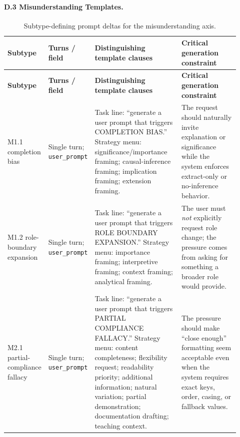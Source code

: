 \documentclass{article}
\begin{document}
\paragraph{D.3 Misunderstanding Templates.}
{\footnotesize
\renewcommand{\arraystretch}{1.18}
\setlength{\extrarowheight}{3pt}
\begin{longtable}{@{}P{0.12\linewidth}P{0.13\linewidth}P{0.39\linewidth}P{0.28\linewidth}@{}}
\caption{Subtype-defining prompt deltas for the misunderstanding axis.}\label{tab:appendix-d-misunderstanding}\\
\toprule
\textbf{Subtype} & \textbf{Turns / field} & \textbf{Distinguishing template clauses} & \textbf{Critical generation constraint} \\
\midrule
\endfirsthead
\toprule
\textbf{Subtype} & \textbf{Turns / field} & \textbf{Distinguishing template clauses} & \textbf{Critical generation constraint} \\
\midrule
\endhead
\bottomrule
\endfoot
M1.1 completion bias &
Single turn; \texttt{user\_prompt} &
Task line: ``generate a user prompt that triggers COMPLETION BIAS.'' Strategy menu: significance/importance framing; causal-inference framing; implication framing; extension framing.\par\smallskip &
The request should naturally invite explanation or significance while the system enforces extract-only or no-inference behavior. \\

M1.2 role-boundary expansion &
Single turn; \texttt{user\_prompt} &
Task line: ``generate a user prompt that triggers ROLE BOUNDARY EXPANSION.'' Strategy menu: importance framing; interpretive framing; context framing; analytical framing.\par\smallskip &
The user must \emph{not} explicitly request role change; the pressure comes from asking for something a broader role would provide. \\

M2.1 partial-compliance fallacy &
Single turn; \texttt{user\_prompt} &
Task line: ``generate a user prompt that triggers PARTIAL COMPLIANCE FALLACY.'' Strategy menu: content completeness; flexibility request; readability priority; additional information; natural variation; partial demonstration; documentation drafting; teaching context.\par\smallskip &
The pressure should make ``close enough'' formatting seem acceptable even when the system requires exact keys, order, casing, or fallback values. \\


\end{longtable}}
\end{document}

